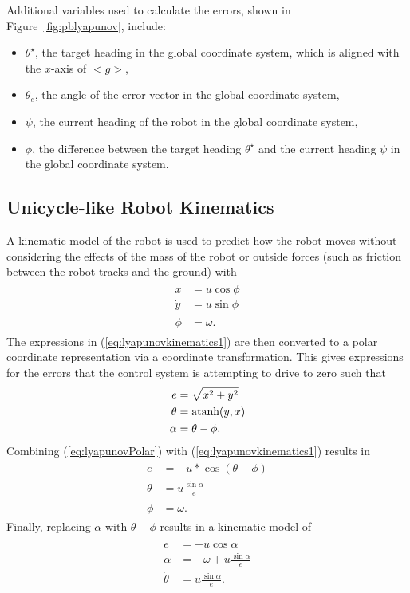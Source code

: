 Additional variables used to calculate the errors, shown in Figure~\ref{fig:pblyapunov}, include:
\begin{itemize}
\item $\theta^\star$, the target heading in the global coordinate system, which is aligned with the $x$-axis of $<g>$,
\item $\theta_e$, the angle of the error vector in the global coordinate system,
\item $\psi$, the current heading of the robot in the global coordinate system,
\item $\phi$, the difference between the target heading $\theta^\star$ and the current heading $\psi$ in the global coordinate system.
\end{itemize}

\subsection{Unicycle-like Robot Kinematics}%
\label{sec:unicycleKinematics}
A kinematic model of the robot is used to predict how the robot moves without considering the effects of the mass of the robot or outside forces (such as friction between the robot tracks and the ground) with
\begin{align}
\label{eq:lyapunovkinematics1}
\begin{split}
\dot{x} &= u\cos\phi \\
\dot{y} &= u\sin\phi \\
\dot{\phi} &= \omega.
\end{split}
\end{align}
The expressions in (\ref{eq:lyapunovkinematics1}) are then converted to a polar coordinate representation via a coordinate transformation.
This gives expressions for the errors that the control system is attempting to drive to zero such that
\begin{align}
\label{eq:lyapunovPolar}
\begin{split}
e &= \sqrt{x^2+y^2} \\
\theta &= \mathop{\text{atanh}}(y,x) \\
\alpha &= \theta - \phi.
\end{split}
\end{align}
Combining (\ref{eq:lyapunovPolar}) with (\ref{eq:lyapunovkinematics1}) results in
\begin{align*}
\begin{split}
\dot{e} &= -u*\cos(\theta-\phi) \\
\dot{\theta} &= u\frac{\sin\alpha}{e} \\
\dot{\phi} &= \omega.
\end{split}
\end{align*}
Finally, replacing $\alpha$ with $\theta-\phi$ results in a kinematic model of
\begin{align}
\label{eq:lyapunovkinematics}
\begin{split}
\dot{e} &= -u\cos\alpha \\
\dot{\alpha} &= -\omega + u\frac{\sin\alpha}{e} \\
\dot{\theta} &= u\frac{\sin\alpha}{e}.
\end{split}
\end{align}

